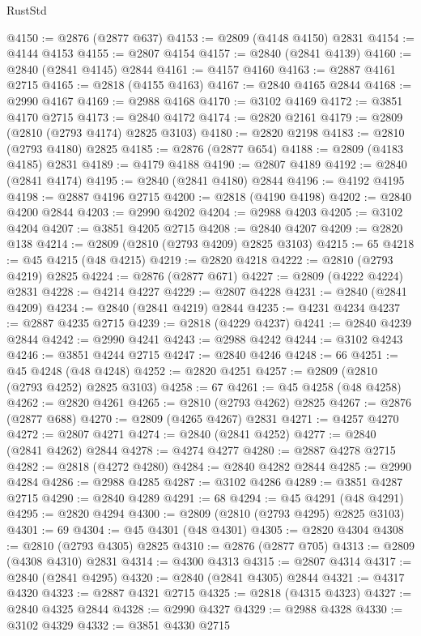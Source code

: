 \begin{lexlean}{RustStd}
\begin{coremodule}
@4150 := @2876 (@2877 @637)
@4153 := @2809 (@4148 @4150) @2831
@4154 := @4144 @4153
@4155 := @2807 @4154
@4157 := @2840 (@2841 @4139)
@4160 := @2840 (@2841 @4145) @2844
@4161 := @4157 @4160
@4163 := @2887 @4161 @2715
@4165 := @2818 (@4155 @4163)
@4167 := @2840 @4165 @2844
@4168 := @2990 @4167
@4169 := @2988 @4168
@4170 := @3102 @4169
@4172 := @3851 @4170 @2715
@4173 := @2840 @4172
@4174 := @2820 @2161
@4179 := @2809 (@2810 (@2793 @4174) @2825 @3103)
@4180 := @2820 @2198
@4183 := @2810 (@2793 @4180) @2825
@4185 := @2876 (@2877 @654)
@4188 := @2809 (@4183 @4185) @2831
@4189 := @4179 @4188
@4190 := @2807 @4189
@4192 := @2840 (@2841 @4174)
@4195 := @2840 (@2841 @4180) @2844
@4196 := @4192 @4195
@4198 := @2887 @4196 @2715
@4200 := @2818 (@4190 @4198)
@4202 := @2840 @4200 @2844
@4203 := @2990 @4202
@4204 := @2988 @4203
@4205 := @3102 @4204
@4207 := @3851 @4205 @2715
@4208 := @2840 @4207
@4209 := @2820 @138
@4214 := @2809 (@2810 (@2793 @4209) @2825 @3103)
@4215 := 65
@4218 := @45 @4215 (@48 @4215)
@4219 := @2820 @4218
@4222 := @2810 (@2793 @4219) @2825
@4224 := @2876 (@2877 @671)
@4227 := @2809 (@4222 @4224) @2831
@4228 := @4214 @4227
@4229 := @2807 @4228
@4231 := @2840 (@2841 @4209)
@4234 := @2840 (@2841 @4219) @2844
@4235 := @4231 @4234
@4237 := @2887 @4235 @2715
@4239 := @2818 (@4229 @4237)
@4241 := @2840 @4239 @2844
@4242 := @2990 @4241
@4243 := @2988 @4242
@4244 := @3102 @4243
@4246 := @3851 @4244 @2715
@4247 := @2840 @4246
@4248 := 66
@4251 := @45 @4248 (@48 @4248)
@4252 := @2820 @4251
@4257 := @2809 (@2810 (@2793 @4252) @2825 @3103)
@4258 := 67
@4261 := @45 @4258 (@48 @4258)
@4262 := @2820 @4261
@4265 := @2810 (@2793 @4262) @2825
@4267 := @2876 (@2877 @688)
@4270 := @2809 (@4265 @4267) @2831
@4271 := @4257 @4270
@4272 := @2807 @4271
@4274 := @2840 (@2841 @4252)
@4277 := @2840 (@2841 @4262) @2844
@4278 := @4274 @4277
@4280 := @2887 @4278 @2715
@4282 := @2818 (@4272 @4280)
@4284 := @2840 @4282 @2844
@4285 := @2990 @4284
@4286 := @2988 @4285
@4287 := @3102 @4286
@4289 := @3851 @4287 @2715
@4290 := @2840 @4289
@4291 := 68
@4294 := @45 @4291 (@48 @4291)
@4295 := @2820 @4294
@4300 := @2809 (@2810 (@2793 @4295) @2825 @3103)
@4301 := 69
@4304 := @45 @4301 (@48 @4301)
@4305 := @2820 @4304
@4308 := @2810 (@2793 @4305) @2825
@4310 := @2876 (@2877 @705)
@4313 := @2809 (@4308 @4310) @2831
@4314 := @4300 @4313
@4315 := @2807 @4314
@4317 := @2840 (@2841 @4295)
@4320 := @2840 (@2841 @4305) @2844
@4321 := @4317 @4320
@4323 := @2887 @4321 @2715
@4325 := @2818 (@4315 @4323)
@4327 := @2840 @4325 @2844
@4328 := @2990 @4327
@4329 := @2988 @4328
@4330 := @3102 @4329
@4332 := @3851 @4330 @2715

\end{coremodule}
\end{lexlean}
